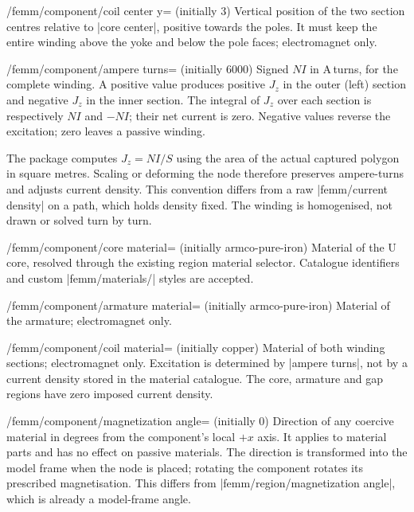 \begin{key}{/femm/component/coil center y= (initially 3)}
Vertical position of the two section centres relative to |core center|,
positive towards the poles. It must keep the entire winding above the yoke
and below the pole faces; electromagnet only.
\end{key}
\begin{key}{/femm/component/ampere turns= (initially 6000)}
Signed $NI$ in A\,turns, for the complete winding. A positive value produces
positive $J_z$ in the outer (left) section and negative $J_z$ in the inner
section. The integral of $J_z$ over each section is respectively $NI$ and
$-NI$; their net current is zero. Negative values reverse the excitation;
zero leaves a passive winding.

The package computes $J_z=NI/S$ using the area of the actual captured
polygon in square metres. Scaling or deforming the node therefore preserves
ampere-turns and adjusts current density. This convention differs from a raw
|femm/current density| on a path, which holds density fixed.
The winding is homogenised, not drawn or solved turn by turn.
\end{key}
\begin{key}{/femm/component/core material= (initially armco-pure-iron)}
Material of the U core, resolved through the existing region material
selector. Catalogue identifiers and custom |femm/materials/| styles are accepted.
\end{key}
\begin{key}{/femm/component/armature material= (initially armco-pure-iron)}
Material of the armature; electromagnet only.
\end{key}
\begin{key}{/femm/component/coil material= (initially copper)}
Material of both winding sections; electromagnet only. Excitation is determined
by |ampere turns|, not by a current density stored in the material catalogue.
The core, armature and gap regions have zero imposed current density.
\end{key}
\begin{key}{/femm/component/magnetization angle= (initially 0)}
Direction of any coercive material in degrees from the component's local
$+x$ axis. It applies to material parts and has no effect on passive materials.
The direction is transformed into the model frame when the node is placed;
rotating the component rotates its prescribed magnetisation. This differs
from |femm/region/magnetization angle|, which is already a model-frame angle.
\end{key}
